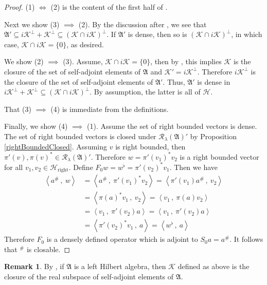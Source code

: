 \documentclass[12pt]{amsart}
\theoremstyle{definition}
\newtheorem{remark}[thm]{Remark}
\def\cal{\mathcal}
\newcommand\ip[2]{\left\langle #1\, ,\!\ #2 \right\rangle}
\newcommand\R{{\cal R}}
\def \rt{\operatorname{right}}
\begin{document}
\begin{proof}
    (1) $\iff$ (2) is the content of the first half of \cite[Section 5]{RvD}.

    Next we show (3) $\implies$ (2).  By the discussion after \cite[Proposition 5.3]{RvD}, we see that $\mathfrak{A}' \subseteq i\cal K^\perp + \cal K^\perp \subseteq (\cal K \cap i\cal K)^\perp$.  If $\mathfrak{A}'$ is dense, then so is $(\cal K \cap i\cal K)^\perp$, in which case, $\cal K \cap i\cal K = \{0\}$, as desired. 
    
    We show (2) $\implies$ (3).  Assume, $\cal K \cap i\cal K = \{0\}$, then by \cite[Lemma 5.12]{RvD}, this implies $\cal K$ is the closure of the set of self-adjoint elements of $\mathfrak{A}$ and $\cal K' = i\cal K^{\perp}$.  Therefore $i\cal K^{\perp}$ is the closure of the set of self-adjoint elements of $\mathfrak{A}'$.  Thus, $\mathfrak{A}'$ is dense in $i\cal K^\perp + \cal K^\perp \subseteq (\cal K \cap i\cal K)^\perp$.  By assumption, the latter is all of $\cal H$.

    That (3) $\implies$ (4) is immediate from the definitions.

    Finally, we show (4) $\implies$ (1).  Assume the set of right bounded vectors is dense.  The set of right bounded vectors is closed under $\R_{\lambda}(\mathfrak{A})'$ by Proposition \ref{rightBoundedClosed}.  Assuming $v$ is right bounded, then $\pi'(v), \pi(v)^* \in \R_{\lambda}(\mathfrak{A})'$.  Therefore $w = \pi'(v_1)^*v_2$ is a right bounded vector for all $v_1, v_2 \in \cal H_{\rt}$.  Define $F_0 w = w^\flat = \pi'(v_2)^*v_1$.  Then we have
    \begin{align}
        \ip{a^\#}{w} & = \ip{a^\#}{\pi'(v_1)^*v_2}  = \ip{\pi'(v_1)a^\#}{v_2} \nonumber \\
        & = \ip{\pi(a)^*v_1}{v_2}  = \ip{v_1}{\pi(a)v_2} \nonumber \\
        & = \ip{v_1}{\pi'(v_2)a} = \ip{v_1}{\pi'(v_2)a}  \nonumber \\
        & = \ip{\pi'(v_2)^*v_1}{a} = \ip{w^\flat}{a} \nonumber
    \end{align}
    Therefore $F_0$ is a densely defined operator which is adjoint to $S_0 a = a^\#$.  It follows that $^\#$ is closable.
\end{proof}

\begin{remark}
    By \cite[Lemma 5.12]{RvD}, if $\mathfrak{A}$ is a left Hilbert algebra, then $\cal K$ defined as above is the closure of the real subspace of self-adjoint elements of $\mathfrak{A}$.
\end{remark}
\end{document}
